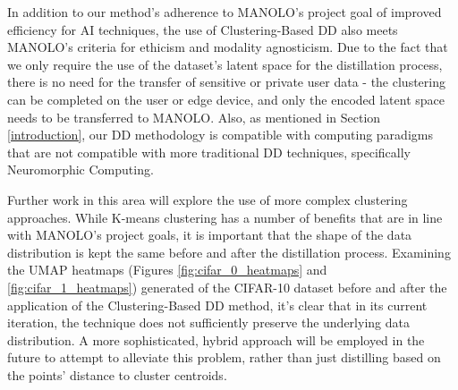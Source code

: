In addition to our method's adherence to MANOLO's project goal of improved efficiency for AI techniques, the use of Clustering-Based DD also meets MANOLO's criteria for ethicism and modality agnosticism. Due to the fact that we only require the use of the dataset's latent space for the distillation process, there is no need for the transfer of sensitive or private user data - the clustering can be completed on the user or edge device, and only the encoded latent space needs to be transferred to MANOLO. Also, as mentioned in Section \ref{introduction}, our DD methodology is compatible with computing paradigms that are not compatible with more traditional DD techniques, specifically Neuromorphic Computing.

Further work in this area will explore the use of more complex clustering approaches. While K-means clustering has a number of benefits that are in line with MANOLO's project goals, it is important that the shape of the data distribution is kept the same before and after the distillation process. Examining the UMAP heatmaps (Figures \ref{fig:cifar_0_heatmaps} and \ref{fig:cifar_1_heatmaps}) generated of the CIFAR-10 dataset before and after the application of the Clustering-Based DD method, it's clear that in its current iteration, the technique does not sufficiently preserve the underlying data distribution. A more sophisticated, hybrid approach will be employed in the future to attempt to alleviate this problem, rather than just distilling based on the points' distance to cluster centroids.
